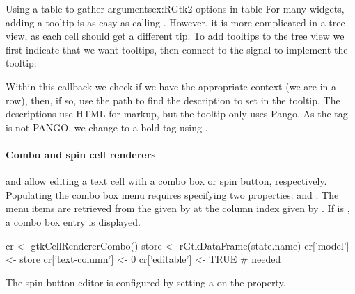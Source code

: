 \begin{example}{Using a table to gather arguments}{ex:RGtk2-options-in-table}
For many widgets, adding a
tooltip is as easy as calling
. However, it is more complicated in
a tree view, as each cell should get a different tip.  To add tooltips
to the tree view we first indicate that we want tooltips, then connect
to the  signal to implement the tooltip:
\begin{Schunk}
\end{Schunk}
%
Within this callback we check if we have the appropriate context (we
are in a row), then, if so, use the path to find the description to
set in the tooltip. The descriptions use HTML for markup, but the
tooltip only uses Pango. As the  tag is not PANGO, we
change to a bold tag using .
\end{example}



\paragraph{Combo and spin cell renderers}

 and  allow
editing a text cell with a combo box or spin button,
respectively. Populating the combo box menu requires specifying two
properties:  and . The menu items are
retrieved from the  given by  at the
column index given by .  If  is
, a combo box entry is displayed.
\begin{Schunk}
\begin{Sinput}
 cr <- gtkCellRendererCombo()
 store <- rGtkDataFrame(state.name)
 cr['model'] <- store
 cr['text-column'] <- 0
 cr['editable'] <- TRUE                  # needed
\end{Sinput}
\end{Schunk}
%
The spin button editor is configured by setting a
 on the  property.


